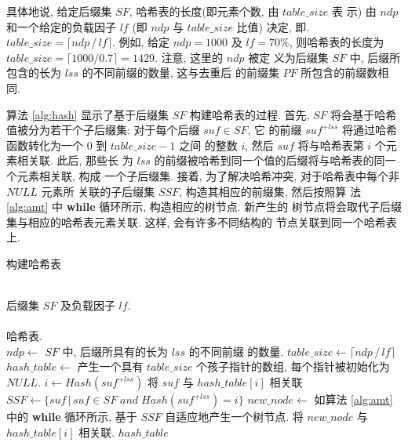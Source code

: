 具体地说, 给定后缀集 $SF$, 哈希表的长度(即元素个数, 由 $table\_size$ 表
示) 由 $ndp$ 和一个给定的负载因子 $lf$
(即 $ndp$ 与 $table\_size$ 比值) 决定, 即.
$table\_size = \lceil ndp\,/\,lf \rceil$. 例如, 给定 $ndp =
1000$ 及 $lf = 70\%$, 则哈希表的长度为
$table\_size = \lceil 1000/0.7 \rceil = 1429$. 注意, 这里的 $ndp$ 被定
义为后缀集 $SF$ 中, 后缀所包含的长为 $lss$ 的不同前缀的数量, 这与去重后
的前缀集 $PF$ 所包含的前缀数相同.

算法 \ref{alg:hash} 显示了基于后缀集 $SF$ 构建哈希表的过程.  首先,
$SF$ 将会基于哈希值被分为若干个子后缀集: 对于每个后缀 $suf \in SF$, 它
的前缀 $suf^{+lss}$ 将通过哈希函数转化为一个 0 到 $table\_size-1$ 之间
的整数 $i$, 然后 $suf$ 将与哈希表第 $i$ 个元素相关联. 此后, 那些长
为 $lss$ 的前缀被哈希到同一个值的后缀将与哈希表的同一个元素相关联, 构成
一个子后缀集. 接着, 为了解决哈希冲突, 对于哈希表中每个非 $NULL$ 元素所
关联的子后缀集 $SSF$, 构造其相应的前缀集, 然后按照算
法 \ref{alg:amt} 中 \textbf{while} 循环所示, 构造相应的树节点. 新产生的
树节点将会取代子后缀集与相应的哈希表元素关联. 这样, 会有许多不同结构的
节点关联到同一个哈希表上.



\begin{algorithm}
  \caption{构建哈希表}\scriptsize
  \label{alg:hash}
  \begin{algorithmic}[1]
    \REQUIRE ~~\\
    后缀集 $SF$ 及负载因子 $lf$. \\
    \ENSURE ~~\\
    哈希表.\\
    \STATE
    \STATE $ndp \leftarrow$ $SF$ 中, 后缀所具有的长为 $lss$ 的不同前缀
    的数量.
    \STATE $table\_size \leftarrow \lceil ndp\,/\,lf \rceil$
    \STATE $hash\_table \leftarrow$ 产生一个具有
    $table\_size$ 个孩子指针的数组, 每个指针被初始化为 $NULL$.
    \STATE
    \STATE $i \leftarrow Hash(suf^{+lss})$
    \STATE 将 $suf$ 与 $hash\_table[i]$ 相关联
    \ENDFOR
    \STATE
    \STATE $SSF \leftarrow \{suf\,|\,suf\in SF\; and\; Hash(suf^{+lss})=i\}$
    \STATE $new\_node \leftarrow$ 如算法 \ref{alg:amt} 中的
    \textbf{while} 循环所示, 基于 $SSF$ 自适应地产生一个树节点.
    \STATE 将 $new\_node$ 与 $hash\_table[i]$ 相关联.
    \ENDIF
    \ENDFOR
    \STATE
    \RETURN $hash\_table$
  \end{algorithmic}
\end{algorithm}


